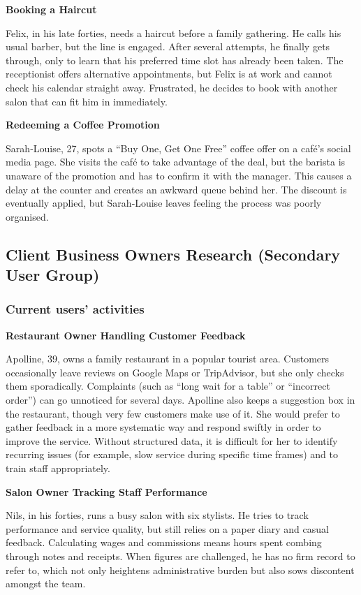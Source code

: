\documentclass[]{VUMIFTemplateClass}
\begin{document}
\newpage

\textbf{Booking a Haircut}

Felix, in his late forties, needs a haircut before a family gathering. He calls his usual barber, but the line is engaged. After several attempts, he finally gets through, only to learn that his preferred time slot has already been taken. The receptionist offers alternative appointments, but Felix is at work and cannot check his calendar straight away. Frustrated, he decides to book with another salon that can fit him in immediately.

\textbf{Redeeming a Coffee Promotion}

Sarah‑Louise, 27, spots a “Buy One, Get One Free” coffee offer on a café’s social media page. She visits the café to take advantage of the deal, but the barista is unaware of the promotion and has to confirm it with the manager. This causes a delay at the counter and creates an awkward queue behind  her. The discount is eventually applied, but Sarah‑Louise leaves feeling the process was poorly organised.

\subsection{Client Business Owners Research (Secondary User Group)}

\subsubsection{Current users' activities}

\textbf{Restaurant Owner Handling Customer Feedback}

Apolline, 39, owns a family restaurant in a popular tourist area. Customers occasionally leave reviews on Google Maps or TripAdvisor, but she only checks them sporadically. Complaints (such as “long wait for a table” or “incorrect order”) can go unnoticed for several days. Apolline also keeps a suggestion box in the restaurant, though very few customers make use of it. She would prefer to gather feedback in a more systematic way and respond swiftly in order to improve the service. Without structured data, it is difficult for her to identify recurring issues (for example, slow service during specific time frames) and to train staff appropriately.

\textbf{Salon Owner Tracking Staff Performance}

Nils, in his forties, runs a busy salon with six stylists. He tries to track performance and service quality, but still relies on a paper diary and casual feedback. Calculating wages and commissions means hours spent combing through notes and receipts. When figures are challenged, he has no firm record to refer to, which not only heightens administrative burden but also sows discontent amongst the team.
\end{document}
